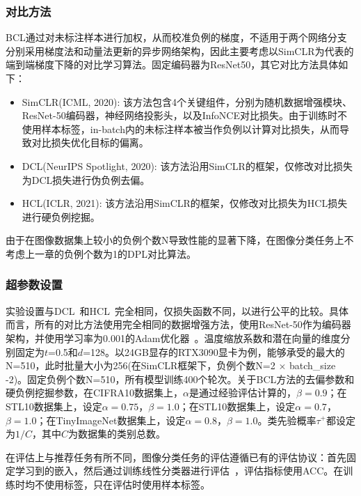 \subsubsection{对比方法}
BCL通过对未标注样本进行加权，从而校准负例的梯度，不适用于两个网络分支分别采用梯度法和动量法更新的异步网络架构，因此主要考虑以SimCLR\cite{Chen:2020:ICML}为代表的端到端梯度下降的对比学习算法。固定编码器为ResNet50，其它对比方法具体如下：
\begin{itemize}
\item SimCLR\cite{Chen:2020:ICML}(ICML, 2020): 该方法包含4个关键组件，分别为随机数据增强模块、ResNet-50编码器，神经网络投影头，以及InfoNCE对比损失。由于训练时不使用样本标签，in-batch内的未标注样本被当作负例以计算对比损失，从而导致对比损失优化目标的偏离。

\item DCL\cite{Chuang:2020:NIPS}(NeurIPS Spotlight, 2020): 该方法沿用SimCLR的框架，仅修改对比损失为DCL损失进行伪负例去偏。

\item HCL\cite{Robinson:2021:ICLR}(ICLR, 2021): 该方法沿用SimCLR的框架，仅修改对比损失为HCL损失进行硬负例挖掘。
\end{itemize}
由于在图像数据集上较小的负例个数N导致性能的显著下降，在图像分类任务上不考虑上一章的负例个数为1的DPL对比算法。

\subsubsection{超参数设置}
实验设置与DCL~\cite{Chuang:2020:NIPS}和HCL~\cite{Robinson:2021:ICLR}完全相同，仅损失函数不同，以进行公平的比较。具体而言，所有的对比方法使用完全相同的数据增强方法，使用ResNet-50\cite{He:2016:CVPR}作为编码器架构，并使用学习率为0.001的Adam优化器~\cite{Adam:2015:ICLR}。温度缩放系数和潜在向量的维度分别固定为$t$=0.5和$d$=128。以24GB显存的RTX3090显卡为例，能够承受的最大的N=510，此时批量大小为256(在SimCLR框架下，负例个数N=2 $\times$ batch\_size -2)。固定负例个数N=510，所有模型训练400个轮次。关于BCL方法的去偏参数和硬负例挖掘参数，在CIFRA10数据集上，$\alpha$是通过经验评估计算的，$\beta=0.9$；在STL10数据集上，设定$\alpha=0.75$，$\beta=1.0$；在STL10数据集上，设定$\alpha=0.7$，$\beta=1.0$；在TinyImageNet数据集上，设定$\alpha=0.8$，$\beta=1.0$。类先验概率$\tau^+$都设定为$1/C$，其中$C$为数据集的类别总数。


在评估上与推荐任务有所不同，图像分类任务的评估遵循已有的评估协议：首先固定学习到的嵌入，然后通过训练线性分类器进行评估~\cite{Lajanugen:2018:ICLR,Robinson:2021:ICLR}，评估指标使用ACC\cite{ml:2018}。在训练时均不使用标签，只在评估时使用样本标签。


